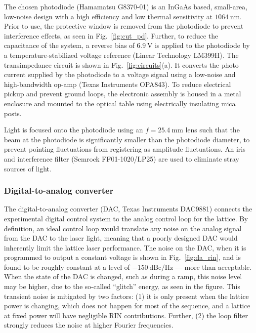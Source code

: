 \documentclass[twocolumn,aip,rsi,reprint,bibnotes]{revtex4-1}
\newcommand\unit[2]{\ensuremath{#1~\mathrm{{#2}}}}
\begin{document}
The chosen photodiode (Hamamatsu G8370-01) is an InGaAs based, small-area, low-noise design with a high efficiency and low thermal sensitivity at \unit{1064}{nm}.
Prior to use, the protective window is removed from the photodiode to prevent interference effects, as seen in Fig.~\ref{fig:cut_pd}.
Further, to reduce the capacitance of the system, a reverse bias of \unit{6.9}{V} is applied to the photodiode by a temperature-stabilized voltage reference (Linear Technology LM399H).
The transimpedance circuit is shown in Fig.~\ref{fig:circuits}(a).
It converts the photo current supplied by the photodiode to a voltage signal using a low-noise and high-bandwidth op-amp (Texas Instruments OPA843).
To reduce electrical pickup and prevent ground loops, the electronic assembly is housed in a metal enclosure and mounted to the optical table using electrically insulating mica posts.

Light is focused onto the photodiode using an $f=\unit{25.4}{mm}$ lens such that the beam at the photodiode is significantly smaller than the photodiode diameter, to prevent pointing fluctuations from registering as amplitude fluctuations.
An iris and interference filter (Semrock FF01-1020/LP25) are used to eliminate stray sources of light.


\subsubsection{Digital-to-analog converter}
The digital-to-analog converter (DAC, Texas Instruments DAC9881) connects the experimental digital control system to the analog control loop for the lattice.
By definition, an ideal control loop would translate any noise on the analog signal from the DAC to the laser light, meaning that a poorly designed DAC would inherently limit the lattice laser performance.
The noise on the DAC, when it is programmed to output a constant voltage is shown in Fig.~\ref{fig:da_rin}, and is found to be roughly constant at a level of \unit{-150}{dBc/Hz} --- more than acceptable.
When the state of the DAC is changed, such as during a ramp, this noise level may be higher, due to the so-called ``glitch'' energy, as seen in the figure.
This transient noise is mitigated by two factors: (1) it is only present when the lattice power is changing, which does not happen for most of the sequence, and a lattice at fixed power will have negligible RIN contributions. Further, (2) the loop filter strongly reduces the noise at higher Fourier frequencies.
\end{document}
